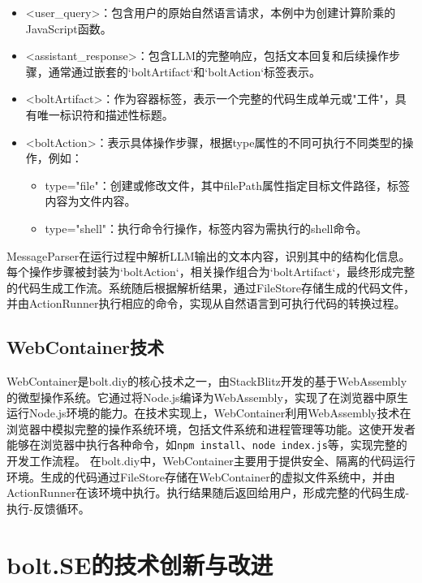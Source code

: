 \begin{itemize}
    \item \textless user\_query\textgreater：包含用户的原始自然语言请求，本例中为创建计算阶乘的JavaScript函数。
    \item \textless assistant\_response\textgreater：包含LLM的完整响应，包括文本回复和后续操作步骤，通常通过嵌套的`boltArtifact`和`boltAction`标签表示。
    \item \textless boltArtifact\textgreater：作为容器标签，表示一个完整的代码生成单元或"工件"，具有唯一标识符和描述性标题。
    \item \textless boltAction\textgreater：表示具体操作步骤，根据type属性的不同可执行不同类型的操作，例如：
    \begin{itemize}
        \item type="file"：创建或修改文件，其中filePath属性指定目标文件路径，标签内容为文件内容。
        \item type="shell"：执行命令行操作，标签内容为需执行的shell命令。
    \end{itemize}
\end{itemize}

MessageParser在运行过程中解析LLM输出的文本内容，识别其中的结构化信息。每个操作步骤被封装为`boltAction`，相关操作组合为`boltArtifact`，最终形成完整的代码生成工作流。系统随后根据解析结果，通过FileStore存储生成的代码文件，并由ActionRunner执行相应的命令，实现从自然语言到可执行代码的转换过程。

\subsection{WebContainer技术}

WebContainer是bolt.diy的核心技术之一，由StackBlitz开发的基于WebAssembly的微型操作系统。它通过将Node.js编译为WebAssembly，实现了在浏览器中原生运行Node.js环境的能力\cite{WebContainer2023}。在技术实现上，WebContainer利用WebAssembly技术在浏览器中模拟完整的操作系统环境，包括文件系统和进程管理等功能。这使开发者能够在浏览器中执行各种命令，如\texttt{npm install}、\texttt{node index.js}等，实现完整的开发工作流程。
在bolt.diy中，WebContainer主要用于提供安全、隔离的代码运行环境。生成的代码通过FileStore存储在WebContainer的虚拟文件系统中，并由ActionRunner在该环境中执行。执行结果随后返回给用户，形成完整的代码生成-执行-反馈循环。

\section{bolt.SE的技术创新与改进}

